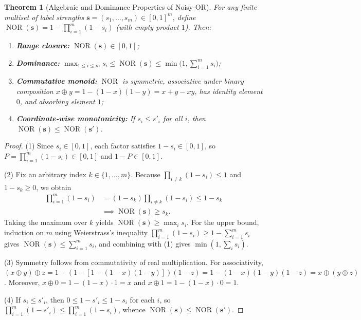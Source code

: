 \documentclass[10pt,twocolumn,letterpaper]{article}
\makeatletter
\theoremstyle{plain}
\newtheorem{theorem}{Theorem}[section]
\theoremstyle{definition}
\theoremstyle{remark}
\DeclareRobustCommand{\_}{\ifmmode\nfss@text{\textunderscore}\else\textunderscore\penalty\@highpenalty\hskip\z@skip\fi}
\makeatother
\begin{document}
\begin{theorem}[Algebraic and Dominance Properties of Noisy-OR]
\label{thm:noisyor}
For any finite multiset of label strengths $\mathbf{s} = (s_1, \dots, s_m) \in [0, 1]^m$, define $\operatorname{NOR}(\mathbf{s}) = 1 - \prod_{i=1}^{m}(1 - s_i)$ (with empty product $1$). Then:
\begin{enumerate}[leftmargin=1.5em,itemsep=1pt,topsep=2pt]
  \item \textbf{Range closure:} $\operatorname{NOR}(\mathbf{s}) \in [0, 1]$;
  \item \textbf{Dominance:} $\max_{1 \le i \le m} s_i \le \operatorname{NOR}(\mathbf{s}) \le \min\!\big(1, \sum_{i=1}^{m} s_i\big)$;
  \item \textbf{Commutative monoid:} $\operatorname{NOR}$ is symmetric, associative under binary composition $x \oplus y = 1 - (1-x)(1-y) = x + y - xy$, has identity element $0$, and absorbing element $1$;
  \item \textbf{Coordinate-wise monotonicity:} If $s_i \le s'_i$ for all $i$, then $\operatorname{NOR}(\mathbf{s}) \le \operatorname{NOR}(\mathbf{s}')$.
\end{enumerate}
\end{theorem}
\begin{proof}
(1) Since $s_i \in [0, 1]$, each factor satisfies $1 - s_i \in [0, 1]$, so $P = \prod_{i=1}^{m}(1 - s_i) \in [0, 1]$ and $1 - P \in [0, 1]$.

(2) Fix an arbitrary index $k \in \{1, \dots, m\}$. Because $\prod_{i \neq k}(1 - s_i) \le 1$ and $1 - s_k \ge 0$, we obtain
\begin{align*}
  \prod_{i=1}^{m}(1 - s_i) &= (1 - s_k)\prod_{i \neq k}(1 - s_i) \le 1 - s_k\\
  &\implies \operatorname{NOR}(\mathbf{s}) \ge s_k.
\end{align*}
Taking the maximum over $k$ yields $\operatorname{NOR}(\mathbf{s}) \ge \max_i s_i$. For the upper bound, induction on $m$ using Weierstrass's inequality $\prod_{i=1}^{m}(1 - s_i) \ge 1 - \sum_{i=1}^{m} s_i$ gives $\operatorname{NOR}(\mathbf{s}) \le \sum_{i=1}^{m} s_i$, and combining with (1) gives $\min(1, \sum_i s_i)$.

(3) Symmetry follows from commutativity of real multiplication. For associativity, $(x \oplus y) \oplus z = 1 - (1 - [1 - (1-x)(1-y)])(1-z) = 1 - (1-x)(1-y)(1-z) = x \oplus (y \oplus z)$. Moreover, $x \oplus 0 = 1 - (1-x)\cdot 1 = x$ and $x \oplus 1 = 1 - (1-x)\cdot 0 = 1$.

(4) If $s_i \le s'_i$, then $0 \le 1 - s'_i \le 1 - s_i$ for each $i$, so $\prod_{i=1}^{m}(1 - s'_i) \le \prod_{i=1}^{m}(1 - s_i)$, whence $\operatorname{NOR}(\mathbf{s}) \le \operatorname{NOR}(\mathbf{s}')$.
\end{proof}
\end{document}
